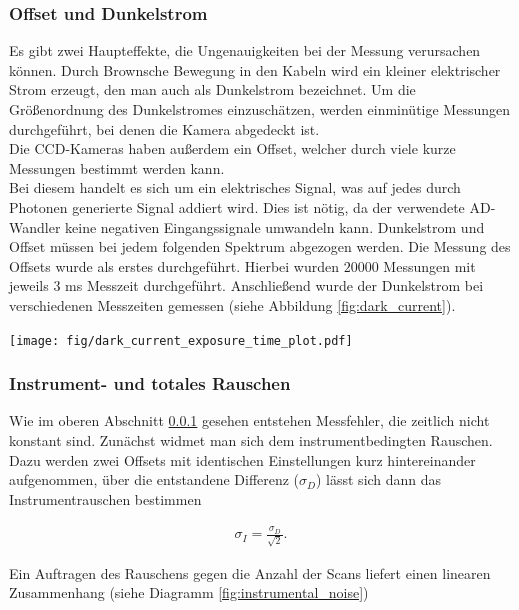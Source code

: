 \documentclass[12pt, a4paper, bibliography=totoc]{scrartcl}
\begin{document}
\begin{multicols}{2}
\subsubsection{Offset und Dunkelstrom}\label{sssec:O&D}

Es gibt zwei Haupteffekte, die Ungenauigkeiten bei der Messung verursachen können.
Durch Brownsche Bewegung in den Kabeln wird ein kleiner elektrischer Strom erzeugt, den man auch als Dunkelstrom bezeichnet.
Um die Größenordnung des Dunkelstromes einzuschätzen, werden einminütige Messungen durchgeführt, bei denen die Kamera abgedeckt ist.\\
Die CCD-Kameras haben außerdem ein Offset, welcher durch viele kurze Messungen bestimmt werden kann.\\
Bei diesem handelt es sich um ein elektrisches Signal, was auf jedes durch Photonen generierte Signal addiert wird. Dies ist nötig, da der verwendete AD-Wandler keine negativen Eingangssignale umwandeln kann.
Dunkelstrom und Offset müssen bei jedem folgenden Spektrum abgezogen werden. 
Die Messung des Offsets wurde als erstes durchgeführt. 
Hierbei wurden $20000$ Messungen mit jeweils $3$ \si{ms} Messzeit durchgeführt.
Anschließend wurde der Dunkelstrom bei verschiedenen Messzeiten gemessen (siehe Abbildung \ref{fig:dark_current}).
    
\begin{center}
	\texttt{[image: fig/dark\_current\_exposure\_time\_plot.pdf]}
	\label{fig:dark_current}
\end{center}

\subsubsection{Instrument- und totales Rauschen}\label{sssec:instrumental_total_noise}

Wie im oberen Abschnitt \ref{sssec:O&D} gesehen entstehen Messfehler, die zeitlich nicht konstant sind. Zunächst widmet man sich dem instrumentbedingten Rauschen.
Dazu werden zwei Offsets mit identischen Einstellungen kurz hintereinander aufgenommen, über die entstandene Differenz ($\sigma_D$) lässt sich dann das Instrumentrauschen bestimmen 

\begin{align}
\sigma_{I} = \frac{\sigma_D}{\sqrt{2}}.\label{eq:instrumental_noise}
\end{align}

Ein Auftragen des Rauschens gegen die Anzahl der Scans liefert einen linearen Zusammenhang (siehe Diagramm \ref{fig:instrumental_noise})


\end{multicols}
\end{document}
